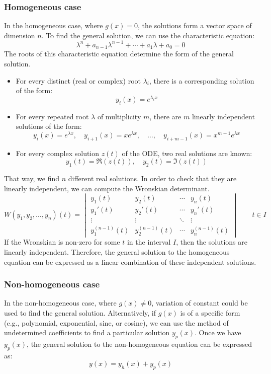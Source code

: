 \subsubsection{Homogeneous case}

In the homogeneous case, where $g(x) = 0$, the solutions form a vector space of dimension $n$. To find the general solution, we can use the characteristic equation:
\[
    \lambda^n + a_{n-1} \lambda^{n-1} + \cdots + a_1 \lambda + a_0 = 0
\]
The roots of this characteristic equation determine the form of the general solution.
\begin{itemize}
    \item For every distinct (real or complex) root $\lambda_i$, there is a corresponding solution of the form:
    \[
        y_i(x) = e^{\lambda_i x}
    \]
    \item For every repeated root $\lambda$ of multiplicity $m$, there are $m$ linearly independent solutions of the form:
    \[
        y_i(x) = e^{\lambda x}, \quad y_{i+1}(x) = xe^{\lambda x}, \quad \ldots, \quad y_{i+m-1}(x) = x^{m-1}e^{\lambda x}
    \]
    \item For every complex solution $z(t)$ of the ODE, two real solutions are known:
    \[
        y_1(t) = \Re(z(t)), \quad y_2(t) = \Im(z(t))
    \]
\end{itemize}

That way, we find $n$ different real solutions. In order to check that they are linearly independent, we can compute the Wronskian determinant.
\[
    W(y_1, y_2, \ldots, y_n)(t) = \begin{vmatrix}
    y_1(t) & y_2(t) & \cdots & y_n(t) \\
    y_1'(t) & y_2'(t) & \cdots & y_n'(t) \\
    \vdots & \vdots & \ddots & \vdots \\
    y_1^{(n-1)}(t) & y_2^{(n-1)}(t) & \cdots & y_n^{(n-1)}(t)
    \end{vmatrix}\qquad t\in I
\]
If the Wronskian is non-zero for some $t$ in the interval $I$, then the solutions are linearly independent. Therefore, the general solution to the homogeneous equation can be expressed as a linear combination of these independent solutions.

\subsubsection{Non-homogeneous case}

In the non-homogeneous case, where $g(x) \neq 0$, variation of constant could be used to find the general solution. Alternatively, if $g(x)$ is of a specific form (e.g., polynomial, exponential, sine, or cosine), we can use the method of undetermined coefficients to find a particular solution $y_p(x)$. Once we have $y_p(x)$, the general solution to the non-homogeneous equation can be expressed as:
\[
    y(x) = y_h(x) + y_p(x)
\]